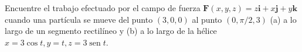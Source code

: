 \item Encuentre el trabajo efectuado por el campo de fuerza $\mathbf{F}(x, y, z) = z\mathbf{i} + x\mathbf{j} + y\mathbf{k}$ cuando una partícula se mueve del punto $(3, 0, 0)$ al punto $(0, \pi/2, 3)$ (a) a lo largo de un segmento rectilíneo y (b) a lo largo de la hélice $x = 3 \cos t, y = t, z = 3 \operatorname{sen} t$.
